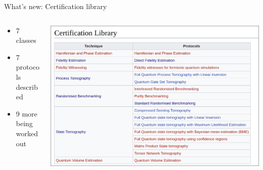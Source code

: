 \documentclass[presentation]{beamer}
\begin{document}
\begin{frame}[label={sec:orgdd7e448}]{What's new: Certification library}
\begin{columns}
\begin{column}{0.4\columnwidth}
\begin{itemize}
\item 7 classes
\item 7 protocols described
\item 9 more being worked out
\end{itemize}
\end{column}

\begin{column}{0.6\columnwidth}
\begin{center}
\includegraphics[width=.9\linewidth]{./figs/wiki_certification.png}
\end{center}
\end{column}
\end{columns}
\end{frame}
\end{document}
